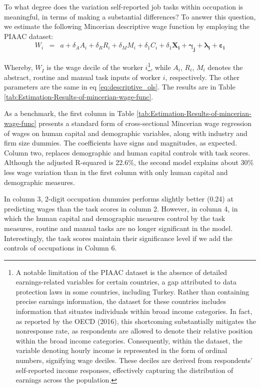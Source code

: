 \begin{onehalfspace}
To what degree does the variation self-reported job tasks within occupation
is meaningful, in terms of making a substantial differences? To answer
this question, we estimate the following Mincerian descriptive wage
function by employing the PIAAC dataset:
\begin{eqnarray}
W_{i} & = & a+\delta_{A}A_{i}+\delta_{R}R_{i}+\delta_{M}M_{i}+\delta_{1}C_{i}+\delta_{1}\mathbf{X_{i}+\gamma_{j}+\lambda_{i}+\varepsilon_{i}}\label{eq:desc_wage_function}
\end{eqnarray}

Whereby, $W_{\dot{I}}$ is the wage decile of the worker $i$\footnote{A notable limitation of the PIAAC dataset is the absence of detailed
earnings-related variables for certain countries, a gap attributed
to data protection laws in some countries, including Turkey. Rather
than containing precise earnings information, the dataset for these
countries includes information that situates individuals within broad
income categories. In fact, as reported by the OECD (2016), this shortcoming
substantially mitigates the nonresponse rate, as respondents are allowed
to denote their relative position within the broad income categories.
Consequently, within the dataset, the variable denoting hourly income
is represented in the form of ordinal numbers, signifying wage deciles.
These deciles are derived from respondents' self-reported income responses,
effectively capturing the distribution of earnings across the population.}, while $A_{i}$, $R_{i}$, $M_{i}$ denotes the abstract, routine
and manual task inputs of worker $i$, respectively. The other parameters
are the same in eq \ref{eq:descriptive_ols}. The results are in Table
\ref{tab:Estimation-Results-of-mincerian-wage-func}. 

As a benchmark, the first column in Table \ref{tab:Estimation-Results-of-mincerian-wage-func}
presents a standard form of cross-sectional Mincerian wage regression
of wages on human capital and demographic variables, along with industry
and firm size dummies. The coefficients have signs and magnitudes,
as expected. Column two, replaces demographic and human capital controls
with task scores. Although the adjusted R-squared is 22.6\%, the second
model explains about 30\% less wage variation than in the first column
with only human capital and demographic measures. 

In column 3, 2-digit occupation dummies performs slightly better (0.24)
at predicting wages than the task scores in column 2. However, in
column 4, in which the human capital and demographic measures control
by the task measures, routine and manual tasks are no longer significant
in the model. Interestingly, the task scores maintain their significance
level if we add the controls of occupations in Column 6.


\end{onehalfspace}
